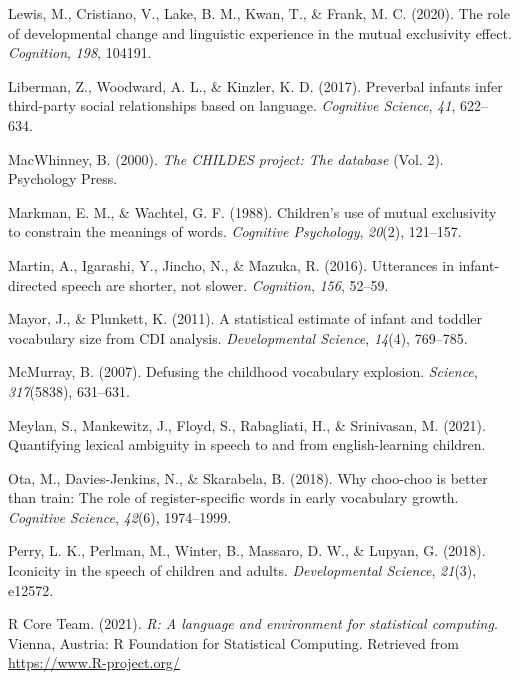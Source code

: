 \documentclass[10pt, letterpaper]{article}
\newenvironment{CSLReferences}%
  {}%
  {\par}
\begin{document}
\begin{CSLReferences}{1}{0}
\leavevmode\hypertarget{ref-lewis2020role}{}%
Lewis, M., Cristiano, V., Lake, B. M., Kwan, T., \& Frank, M. C. (2020).
The role of developmental change and linguistic experience in the mutual
exclusivity effect. \emph{Cognition}, \emph{198}, 104191.

\leavevmode\hypertarget{ref-liberman2017preverbal}{}%
Liberman, Z., Woodward, A. L., \& Kinzler, K. D. (2017). Preverbal
infants infer third-party social relationships based on language.
\emph{Cognitive Science}, \emph{41}, 622--634.

\leavevmode\hypertarget{ref-macwhinney2000childes}{}%
MacWhinney, B. (2000). \emph{The CHILDES project: The database} (Vol.
2). Psychology Press.

\leavevmode\hypertarget{ref-markman1988children}{}%
Markman, E. M., \& Wachtel, G. F. (1988). Children's use of mutual
exclusivity to constrain the meanings of words. \emph{Cognitive
Psychology}, \emph{20}(2), 121--157.

\leavevmode\hypertarget{ref-martin2016utterances}{}%
Martin, A., Igarashi, Y., Jincho, N., \& Mazuka, R. (2016). Utterances
in infant-directed speech are shorter, not slower. \emph{Cognition},
\emph{156}, 52--59.

\leavevmode\hypertarget{ref-mayor2011statistical}{}%
Mayor, J., \& Plunkett, K. (2011). A statistical estimate of infant and
toddler vocabulary size from CDI analysis. \emph{Developmental Science},
\emph{14}(4), 769--785.

\leavevmode\hypertarget{ref-mcmurray2007defusing}{}%
McMurray, B. (2007). Defusing the childhood vocabulary explosion.
\emph{Science}, \emph{317}(5838), 631--631.

\leavevmode\hypertarget{ref-meylan2021quantifying}{}%
Meylan, S., Mankewitz, J., Floyd, S., Rabagliati, H., \& Srinivasan, M.
(2021). Quantifying lexical ambiguity in speech to and from
english-learning children.

\leavevmode\hypertarget{ref-ota2018choo}{}%
Ota, M., Davies-Jenkins, N., \& Skarabela, B. (2018). Why choo-choo is
better than train: The role of register-specific words in early
vocabulary growth. \emph{Cognitive Science}, \emph{42}(6), 1974--1999.

\leavevmode\hypertarget{ref-perry2018iconicity}{}%
Perry, L. K., Perlman, M., Winter, B., Massaro, D. W., \& Lupyan, G.
(2018). Iconicity in the speech of children and adults.
\emph{Developmental Science}, \emph{21}(3), e12572.

\leavevmode\hypertarget{ref-r2021}{}%
R Core Team. (2021). \emph{R: A language and environment for statistical
computing}. Vienna, Austria: R Foundation for Statistical Computing.
Retrieved from \url{https://www.R-project.org/}


\end{CSLReferences}
\end{document}
